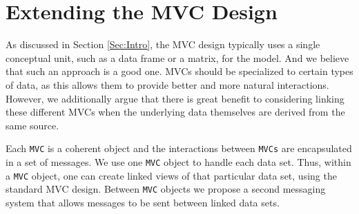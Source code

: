 \documentclass{article}[11pt]
\newcommand{\Robject}[1]{{\texttt{#1}}}
\begin{document}
\section{Extending the MVC Design}
\label{Sec:Extend}

As discussed in Section \ref{Sec:Intro}, the MVC design typically uses a single
conceptual unit, such as a data frame or a matrix, for the model.  And
we believe that such an approach is a good one. MVCs should be
specialized to certain types of data, as this allows them to provide
better and more natural interactions. However, we additionally argue
that there is great benefit to considering linking these different
MVCs when the underlying data themselves are derived from the same source.

Each \Robject{MVC} is a coherent object and the interactions between
\Robject{MVCs} are encapsulated in a set of messages.  We use one
\Robject{MVC} object to handle each data set.  Thus, within a
\Robject{MVC} object, one can create linked views of that particular
data set, using the standard MVC design.  Between \Robject{MVC}
objects we propose a second messaging system that allows messages to
be sent between linked data sets.

\end{document}

